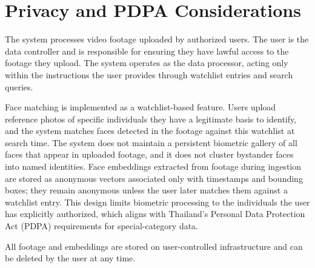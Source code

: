 \section{Privacy and PDPA Considerations}
\label{section:privacy-pdpa}

The system processes video footage uploaded by authorized users. The user is the data controller and is responsible for ensuring they have lawful access to the footage they upload. The system operates as the data processor, acting only within the instructions the user provides through watchlist entries and search queries.

Face matching is implemented as a watchlist-based feature. Users upload reference photos of specific individuals they have a legitimate basis to identify, and the system matches faces detected in the footage against this watchlist at search time. The system does not maintain a persistent biometric gallery of all faces that appear in uploaded footage, and it does not cluster bystander faces into named identities. Face embeddings extracted from footage during ingestion are stored as anonymous vectors associated only with timestamps and bounding boxes; they remain anonymous unless the user later matches them against a watchlist entry. This design limits biometric processing to the individuals the user has explicitly authorized, which aligns with Thailand's Personal Data Protection Act (PDPA) requirements for special-category data.

All footage and embeddings are stored on user-controlled infrastructure and can be deleted by the user at any time.
